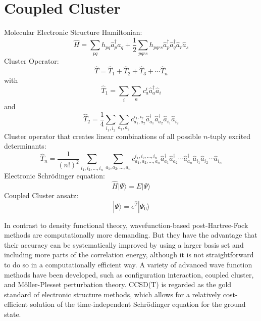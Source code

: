 \documentclass[9pt]{report}
\begin{document}
\section{Coupled Cluster}
Molecular Electronic Structure Hamiltonian:
\begin{equation}
\hat{H}=\sum_{pq}h_{pq}\hat{a}_{p}^{\dagger}\hat{a}_{q}+\frac{1}{2}\sum_{pqrs}h_{pqrs}\hat{a}_{p}^{\dagger}\hat{a}_{q}^{\dagger}\hat{a}_{r}\hat{a}_{s}
\end{equation}
Cluster Operator:
\begin{equation}
\hat{T}=\hat{T}_1+\hat{T}_2+\hat{T}_3+\cdots\hat{T}_n
\end{equation}
with
\begin{equation}
\hat{T}_1=\sum_{i}\sum_{a}c_{a}^{i}\hat{a}_{a}^{\dagger}\hat{a}_{i}
\end{equation}
and
\begin{equation}
\hat{T}_2=\frac{1}{4}\sum_{i_1,i_2}\sum_{a_1,a_2}c_{a_1,a_2}^{i_1,i_2}\hat{a}_{a_1}^{\dagger}\hat{a}_{a_2}^{\dagger}\hat{a}_{i_1}\hat{a}_{i_2}
\end{equation}
Cluster operator that creates linear combinations of all possible $n$-tuply excited determinants:
\begin{equation}
\hat{T}_{n}=\frac{1}{(n!)^2}\sum_{i_1,i_2,...,i_n}\sum_{a_1,a_2,...,a_n}c_{a_1,a_2,...,a_n}^{i_1,i_2,...,i_n}\hat{a}_{a_1}^{\dagger}\hat{a}_{a_2}^{\dagger}\cdots\hat{a}_{a_n}^{\dagger}\hat{a}_{i_1}\hat{a}_{i_2}\cdots\hat{a}_{i_n}
\end{equation}
Electronic Schrödinger equation:
\begin{equation}
\hat{H}|\Psi\rangle = E|\Psi\rangle
\end{equation}
Coupled Cluster ansatz:
\begin{equation}
|\Psi\rangle = e^{\hat{T}}|\Psi_0\rangle
\end{equation}

In contrast to density functional theory, wavefunction-based post-Hartree-Fock methods are computationally more demanding. But they have the advantage that their accuracy can be systematically improved by using a larger basis set and including more parts of the correlation energy, although it is not straightforward to do so in a computationally efficient way. A variety of advanced wave function methods have been developed, such as configuration interaction, coupled cluster, and Möller-Plesset perturbation theory. CCSD(T) is regarded as the gold standard of electronic structure methods, which allows for a relatively cost-efficient solution of the time-independent Schrödinger equation for the ground state.
\end{document}
